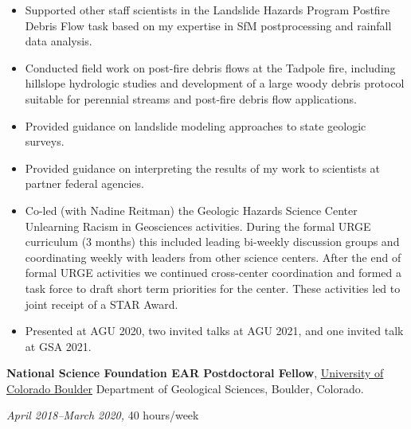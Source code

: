 \documentclass[10pt]{article}
\begin{document}
\begin{itemize}
\item Supported other staff scientists in the Landslide Hazards Program Postfire Debris Flow task based on my expertise in SfM postprocessing and rainfall data analysis.  
\item Conducted field work on post-fire debris flows at the Tadpole fire, including hillslope hydrologic studies and development of a large woody debris protocol suitable for perennial streams and post-fire debris flow applications. 
\item Provided guidance on landslide modeling approaches to state geologic surveys.
\item Provided guidance on interpreting the results of my work to scientists at partner federal agencies. 
\item Co-led (with Nadine Reitman) the Geologic Hazards Science Center Unlearning Racism in Geosciences activities. During the formal URGE curriculum (3 months) this included leading bi-weekly discussion groups and coordinating weekly with leaders from other science centers. After the end of formal URGE activities we continued cross-center coordination and formed a task force to draft short term priorities for the center. These activities led to joint receipt of a STAR Award.
\item Presented at AGU 2020, two invited talks at AGU 2021, and one invited talk at GSA 2021.
\end{itemize} 

\textbf{National Science Foundation EAR Postdoctoral Fellow}, \href{http://www.colorado.edu/}{{University of Colorado Boulder}} Department of Geological Sciences,
Boulder, Colorado. 

\textit{April 2018--March 2020,}  40 hours/week 
\end{document}

